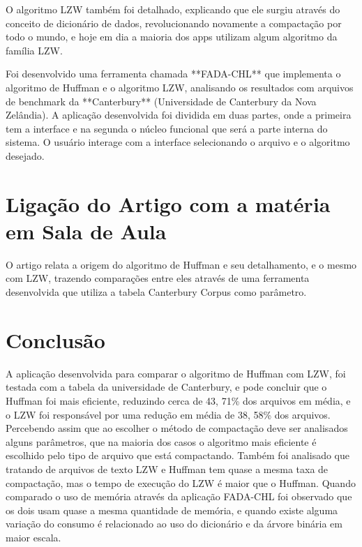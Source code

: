 \documentclass[12pt]{article}
\begin{document}
O algoritmo LZW também foi detalhado, explicando que ele surgiu através do conceito de dicionário de dados, revolucionando novamente a compactação por todo o mundo, e hoje em dia a maioria dos apps utilizam algum algoritmo da família LZW.

Foi desenvolvido uma ferramenta chamada **FADA-CHL** que implementa o algoritmo de Huffman e o algoritmo LZW, analisando os resultados com arquivos de benchmark da **Canterbury** (Universidade de Canterbury da Nova Zelândia). A aplicação desenvolvida foi dividida em duas partes, onde a primeira tem a interface e na segunda o núcleo funcional que será a parte interna do sistema. O usuário interage com a interface selecionando o arquivo e o algoritmo desejado.

\section {Ligação do Artigo com a matéria em Sala de Aula}

O artigo relata a origem do algoritmo de Huffman e seu detalhamento, e o mesmo com LZW, trazendo comparações entre eles através de uma ferramenta desenvolvida que utiliza a tabela Canterbury Corpus como parâmetro.

\section {Conclusão}

A aplicação desenvolvida para comparar o algoritmo de Huffman com LZW, foi testada com a tabela da universidade de Canterbury, e pode concluir que o Huffman foi mais eficiente, reduzindo cerca de 43, 71\% dos arquivos em média, e o LZW foi responsável por uma redução em média de 38, 58\% dos arquivos. Percebendo assim que ao escolher o método de compactação deve ser analisados alguns parâmetros, que na maioria dos casos o algoritmo mais eficiente é escolhido pelo tipo de arquivo que está compactando. Também foi analisado que tratando de arquivos de texto LZW e Huffman tem quase a mesma taxa de compactação, mas o tempo de execução do LZW é maior que o Huffman. Quando comparado o uso de memória através da aplicação FADA-CHL foi observado que os dois usam quase a mesma quantidade de memória, e quando existe alguma variação do consumo é relacionado ao uso do dicionário e da árvore binária em maior escala.

\cite{FADA-CHL}



\end{document}
